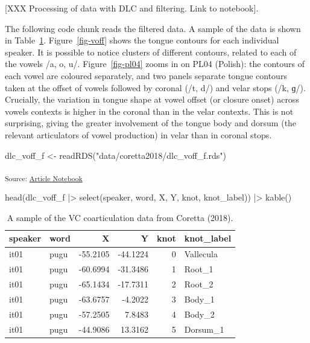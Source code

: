 \documentclass[
]{interact}
\newenvironment{Shaded}{\begin{snugshade}}{\end{snugshade}}
\newcommand{\FunctionTok}[1]{\textcolor[rgb]{0.28,0.35,0.67}{#1}}
\newcommand{\NormalTok}[1]{\textcolor[rgb]{0.00,0.23,0.31}{#1}}
\newcommand{\OtherTok}[1]{\textcolor[rgb]{0.00,0.23,0.31}{#1}}
\newcommand{\SpecialCharTok}[1]{\textcolor[rgb]{0.37,0.37,0.37}{#1}}
\newcommand{\StringTok}[1]{\textcolor[rgb]{0.13,0.47,0.30}{#1}}
\begin{document}
{[}XXX Processing of data with DLC and filtering. Link to notebook{]}.

The following code chunk reads the filtered data. A sample of the data
is shown in Table~\ref{tbl-dlc-voff}. Figure~\ref{fig-voff} shows the
tongue contours for each individual speaker. It is possible to notice
clusters of different contours, related to each of the vowels /a, o, u/.
Figure~\ref{fig-pl04} zooms in on PL04 (Polish): the contours of each
vowel are coloured separately, and two panels separate tongue contours
taken at the offset of vowels followed by coronal (/t, d/) and velar
stops (/k, ɡ/). Crucially, the variation in tongue shape at vowel offset
(or closure onset) across vowels contexts is higher in the coronal than
in the velar contexts. This is not surprising, giving the greater
involvement of the tongue body and dorsum (the relevant articulators of
vowel production) in velar than in coronal stops.

\begin{Shaded}
\begin{Highlighting}[]
\NormalTok{dlc\_voff\_f }\OtherTok{\textless{}{-}} \FunctionTok{readRDS}\NormalTok{(}\StringTok{"data/coretta2018/dlc\_voff\_f.rds"}\NormalTok{)}
\end{Highlighting}
\end{Shaded}

\textsubscript{Source:
\href{https://stefanocoretta.github.io/mv_uti/index.qmd.html}{Article
Notebook}}

\begin{Shaded}
\begin{Highlighting}[]
\FunctionTok{head}\NormalTok{(dlc\_voff\_f }\SpecialCharTok{|\textgreater{}} \FunctionTok{select}\NormalTok{(speaker, word, X, Y, knot, knot\_label)) }\SpecialCharTok{|\textgreater{}} \FunctionTok{kable}\NormalTok{()}
\end{Highlighting}
\end{Shaded}

\begin{longtable}[]{@{}llrrrl@{}}

\caption{\label{tbl-dlc-voff}A sample of the VC coarticulation data from
Coretta (2018).}

\tabularnewline

\toprule\noalign{}
speaker & word & X & Y & knot & knot\_label \\
\midrule\noalign{}
\endhead
\bottomrule\noalign{}
\endlastfoot
it01 & pugu & -55.2105 & -44.1224 & 0 & Vallecula \\
it01 & pugu & -60.6994 & -31.3486 & 1 & Root\_1 \\
it01 & pugu & -65.1434 & -17.7311 & 2 & Root\_2 \\
it01 & pugu & -63.6757 & -4.2022 & 3 & Body\_1 \\
it01 & pugu & -57.2505 & 7.8483 & 4 & Body\_2 \\
it01 & pugu & -44.9086 & 13.3162 & 5 & Dorsum\_1 \\

\end{longtable}
\end{document}
